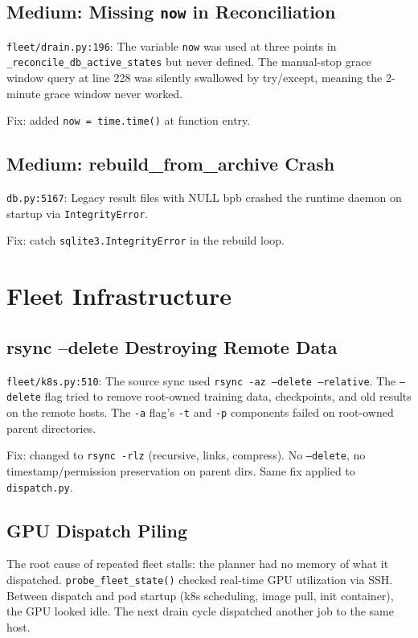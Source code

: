 \documentclass[11pt,a4paper]{report}
\begin{document}
\section{Medium: Missing \texttt{now} in Reconciliation}

\texttt{fleet/drain.py:196}: The variable \texttt{now} was used at three points in \texttt{\_reconcile\_db\_active\_states} but never defined. The manual-stop grace window query at line 228 was silently swallowed by try/except, meaning the 2-minute grace window never worked.

Fix: added \texttt{now = time.time()} at function entry.

\section{Medium: rebuild\_from\_archive Crash}

\texttt{db.py:5167}: Legacy result files with NULL bpb crashed the runtime daemon on startup via \texttt{IntegrityError}.

Fix: catch \texttt{sqlite3.IntegrityError} in the rebuild loop.


\chapter{Fleet Infrastructure}

\section{rsync --delete Destroying Remote Data}

\texttt{fleet/k8s.py:510}: The source sync used \texttt{rsync -az --delete --relative}. The \texttt{--delete} flag tried to remove root-owned training data, checkpoints, and old results on the remote hosts. The \texttt{-a} flag's \texttt{-t} and \texttt{-p} components failed on root-owned parent directories.

Fix: changed to \texttt{rsync -rlz} (recursive, links, compress). No \texttt{--delete}, no timestamp/permission preservation on parent dirs. Same fix applied to \texttt{dispatch.py}.

\section{GPU Dispatch Piling}

The root cause of repeated fleet stalls: the planner had no memory of what it dispatched. \texttt{probe\_fleet\_state()} checked real-time GPU utilization via SSH. Between dispatch and pod startup (k8s scheduling, image pull, init container), the GPU looked idle. The next drain cycle dispatched another job to the same host.
\end{document}
